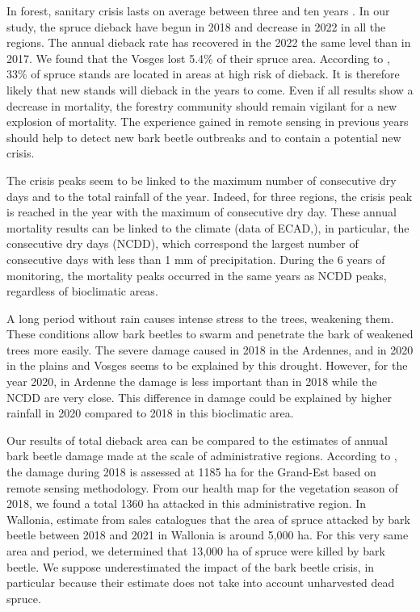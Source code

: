 \documentclass[3p,procedia]{elsarticle}
\begin{document}
In forest, sanitary crisis lasts on average between three and ten years \citep{brunier_guide_2020}.
In our study, the spruce dieback have begun in 2018 and decrease in 2022 in all the regions.
The annual dieback rate has recovered in the 2022 the same level than in 2017.
We found that the Vosges lost 5.4\% of their spruce area. 
According to \citeauthor{piedallu_spatial_2022} \citep{piedallu_spatial_2022}, 33\% of spruce stands are located in areas at high risk of dieback.
It is therefore likely that new stands will dieback in the years to come.
Even if all results show a decrease in mortality, the forestry community should remain vigilant for a new explosion of mortality.
The experience gained in remote sensing in previous years should help to detect new bark beetle outbreaks and to contain a potential new crisis. 

The crisis peaks seem to be linked to the maximum number of consecutive dry days  and to the total rainfall of the year. 
Indeed, for three regions, the crisis peak is reached in the year with the maximum of consecutive dry day.
These annual mortality results can be linked to the climate (data of ECAD,\cite{ecad}), in particular, the consecutive dry days (NCDD), which correspond the largest number of consecutive days with less than 1 mm of precipitation.
During the 6 years of monitoring, the mortality peaks occurred in the same years as NCDD peaks, regardless of bioclimatic areas.

A long period without rain causes intense stress to the trees, weakening them.
These conditions allow bark beetles to swarm and penetrate the bark of weakened trees more easily. 
The severe damage caused in 2018 in the Ardennes, and in 2020 in the plains and Vosges seems to be explained by this drought.
However, for the year 2020, in Ardenne the damage is less important than in 2018 while the NCDD are very close.
This difference in damage could be explained by higher rainfall in 2020 compared to 2018 in this bioclimatic area. 

Our results of total dieback area can be compared to the estimates of annual bark beetle damage made at the scale of administrative regions.
According to \cite{nardi_drought_2022}, the damage during 2018 is assessed at 1185 ha for the Grand-Est based on remote sensing methodology.
From our health map for the vegetation season of 2018, we found a total 1360 ha attacked in this administrative region.
In Wallonia, \cite{saintonge_situation_2022} estimate from sales catalogues that the area of spruce attacked by bark beetle between 2018 and 2021 in Wallonia is around 5,000 ha.
For this very same area and period, we determined that 13,000 ha of spruce were killed by bark beetle.
We suppose \cite{saintonge_situation_2022} underestimated the impact of the bark beetle crisis, in particular because their estimate does not take into account unharvested dead spruce.
\end{document}
